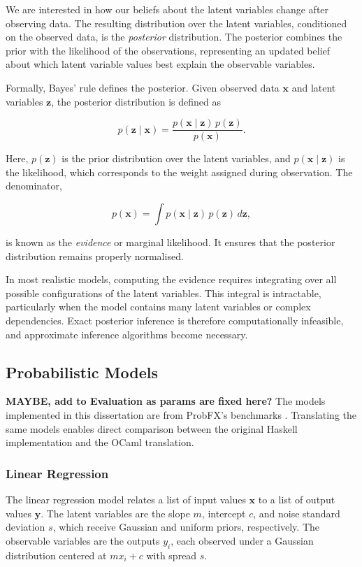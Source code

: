 \documentclass[logo,bsc,singlespacing,parskip,online]{infthesis}
\begin{document}
We are interested in how our beliefs about the latent variables change after observing data. The resulting distribution over the latent variables, conditioned on the observed data, is the \textit{posterior} distribution. The posterior combines the prior with the likelihood of the observations, representing an updated belief about which latent variable values best explain the observable variables.

Formally, Bayes’ rule defines the posterior. Given observed data $\mathbf{x}$ and latent variables $\mathbf{z}$, the posterior distribution is defined as

\[
p(\mathbf{z} \mid \mathbf{x}) = 
\frac{p(\mathbf{x} \mid \mathbf{z}) \, p(\mathbf{z})}
     {p(\mathbf{x})}.
\]

Here, $p(\mathbf{z})$ is the prior distribution over the latent variables, and $p(\mathbf{x} \mid \mathbf{z})$ is the likelihood, which corresponds to the weight assigned during observation. The denominator,

\[
p(\mathbf{x}) = \int p(\mathbf{x} \mid \mathbf{z}) \, p(\mathbf{z}) \, d\mathbf{z},
\]

is known as the \textit{evidence} or marginal likelihood. It ensures that the posterior distribution remains properly normalised.

In most realistic models, computing the evidence requires integrating over all possible configurations of the latent variables. This integral is intractable, particularly when the model contains many latent variables or complex dependencies. Exact posterior inference is therefore computationally infeasible, and approximate inference algorithms become necessary.

\subsection{Probabilistic Models}

\textbf{MAYBE, add to Evaluation as params are fixed here?}
The models implemented in this dissertation are from ProbFX's benchmarks \citep{ProbFX}. Translating the same models enables direct comparison between the original Haskell implementation and the OCaml translation.

\subsubsection{Linear Regression}
The linear regression model relates a list of input values $\mathbf{x}$ to a list of output values $\mathbf{y}$. 
The latent variables are the slope $m$, intercept $c$, and noise standard deviation $s$, which receive Gaussian and uniform priors, respectively. 
The observable variables are the outputs $y_i$, each observed under a Gaussian distribution centered at $m x_i + c$ with spread $s$.
\end{document}
